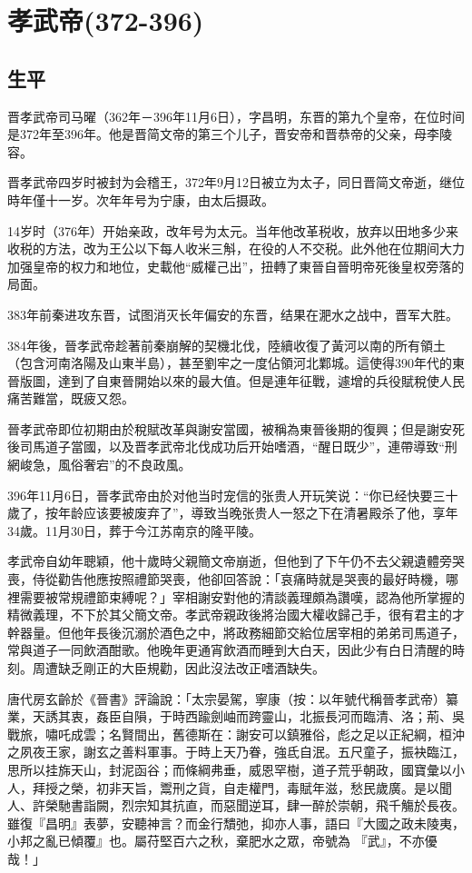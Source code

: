 
\section{孝武帝\tiny(372-396)}

\subsection{生平}

晋孝武帝司马曜（362年－396年11月6日），字昌明，东晋的第九个皇帝，在位时间是372年至396年。他是晋简文帝的第三个儿子，晋安帝和晋恭帝的父亲，母李陵容。

晋孝武帝四岁时被封为会稽王，372年9月12日被立为太子，同日晋简文帝逝，继位時年僅十一岁。次年年号为宁康，由太后摄政。

14岁时（376年）开始亲政，改年号为太元。当年他改革税收，放弃以田地多少来收税的方法，改为王公以下每人收米三斛，在役的人不交税。此外他在位期间大力加强皇帝的权力和地位，史載他“威權己出”，扭轉了東晉自晉明帝死後皇权旁落的局面。

383年前秦进攻东晋，试图消灭长年偏安的东晋，结果在淝水之战中，晋军大胜。

384年後，晉孝武帝趁著前秦崩解的契機北伐，陸續收復了黃河以南的所有領土（包含河南洛陽及山東半島），甚至劉牢之一度佔領河北鄴城。這使得390年代的東晉版圖，達到了自東晉開始以來的最大值。但是連年征戰，遽增的兵役賦稅使人民痛苦難當，既疲又怨。

晉孝武帝即位初期由於稅賦改革與謝安當國，被稱為東晉後期的復興；但是謝安死後司馬道子當國，以及晋孝武帝北伐成功后开始嗜酒，“醒日既少”，連帶導致“刑網峻急，風俗奢宕”的不良政風。

396年11月6日，晉孝武帝由於对他当时宠信的张贵人开玩笑说：“你已经快要三十歲了，按年龄应该要被废弃了”，導致当晚张贵人一怒之下在清暑殿杀了他，享年34歲。11月30日，葬于今江苏南京的隆平陵。

孝武帝自幼年聰穎，他十歲時父親簡文帝崩逝，但他到了下午仍不去父親遺體旁哭喪，侍從勸告他應按照禮節哭喪，他卻回答說：「哀痛時就是哭喪的最好時機，哪裡需要被常規禮節束縛呢？」宰相謝安對他的清談義理頗為讚嘆，認為他所掌握的精微義理，不下於其父簡文帝。孝武帝親政後將治國大權收歸己手，很有君主的才幹器量。但他年長後沉溺於酒色之中，將政務細節交給位居宰相的弟弟司馬道子，常與道子一同飲酒酣歌。他晚年更通宵飲酒而睡到大白天，因此少有白日清醒的時刻。周遭缺乏剛正的大臣規勸，因此沒法改正嗜酒缺失。

唐代房玄齡於《晉書》評論說：「太宗晏駕，寧康（按：以年號代稱晉孝武帝）纂業，天誘其衷，姦臣自隕，于時西踰劍岫而跨靈山，北振長河而臨清、洛；荊、吳戰旅，嘯吒成雲；名賢間出，舊德斯在：謝安可以鎮雅俗，彪之足以正紀綱，桓沖之夙夜王家，謝玄之善料軍事。于時上天乃眷，強氐自泯。五尺童子，振袂臨江，思所以挂旆天山，封泥函谷；而條綱弗垂，威恩罕樹，道子荒乎朝政，國寶彙以小人，拜授之榮，初非天旨，鬻刑之貨，自走權門，毒賦年滋，愁民歲廣。是以聞人、許榮馳書詣闕，烈宗知其抗直，而惡聞逆耳，肆一醉於崇朝，飛千觴於長夜。雖復『昌明』表夢，安聽神言？而金行穨弛，抑亦人事，語曰『大國之政未陵夷，小邦之亂已傾覆』也。屬苻堅百六之秋，棄肥水之眾，帝號為 『武』，不亦優哉！」

